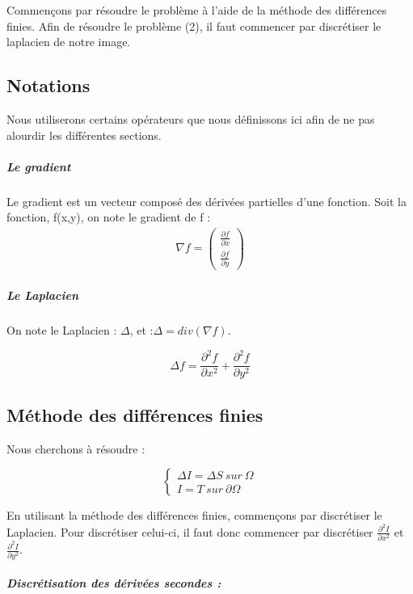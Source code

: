 Commençons par résoudre le problème à l'aide de la méthode des différences finies. Afin de résoudre le problème (2), il faut commencer par discrétiser le laplacien de notre image. 
 \subsection{Notations}
Nous utiliserons certains opérateurs que nous définissons ici afin de ne pas alourdir les différentes sections. 
\subparagraph{Le gradient}
Le gradient est un vecteur composé des dérivées partielles d'une fonction. Soit la fonction, f(x,y), on note le gradient de f : 
\begin{equation*}
\begin{aligned}
\nabla f = \begin{pmatrix}
\frac{\partial f}{\partial x}\\
\frac{\partial f}{\partial y}
\end{pmatrix}
\end{aligned}
\end{equation*}
\subparagraph{Le Laplacien}
On note le Laplacien : $\Delta$, et :$\Delta = div(\nabla f)$.
\begin{center}
\begin{equation*}
    \Delta f  = \frac{\partial^2 f}{\partial x^2}+ \frac{\partial ^2 f}{\partial y^2}
\end{equation*}
\end{center}

\subsection{Méthode des différences finies}
Nous cherchons à résoudre  : 
\begin{center}

\begin{equation*}
    \left \{
    \begin{aligned}
    \Delta I = \Delta S \ sur \ \Omega\\
    I = T \ sur \ \partial \Omega
    \end{aligned}
    \right.
\end{equation*}
\end{center}

En utilisant la méthode des différences finies, commençons par discrétiser le Laplacien.
Pour discrétiser celui-ci, il faut donc commencer par discrétiser $\frac{\partial^2 I}{\partial x^2}$ et  $\frac{\partial^2 I}{\partial y^2}$. 

\subparagraph{Discrétisation des dérivées secondes :}

